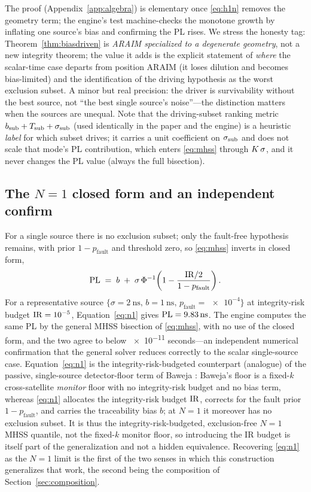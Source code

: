 The proof (Appendix~\ref{app:algebra}) is elementary once \eqref{eq:h1n} removes
the geometry term; the engine's test 
machine-checks the monotone growth by inflating one source's bias and confirming
the PL rises. We stress the honesty tag: Theorem~\ref{thm:biasdriven} is
\emph{ARAIM specialized to a degenerate geometry}, not a new integrity theorem;
the value it adds is the explicit statement of \emph{where} the scalar-time case
departs from position ARAIM (it loses dilution and becomes bias-limited) and the
identification of the driving hypothesis as the worst exclusion subset. A minor
but real precision: the driver is survivability without the best source, not ``the
best single source's noise''---the distinction matters when the sources are
unequal. Note that the driving-subset ranking metric
$b_{\mathrm{sub}}+T_{\mathrm{sub}}+\sigma_{\mathrm{sub}}$ (used identically in the paper and the
engine) is a heuristic \emph{label} for which subset drives; it carries a unit
coefficient on $\sigma_{\mathrm{sub}}$ and does not scale that mode's PL contribution, which
enters \eqref{eq:mhss} through $K\,\sigma$, and it never changes the PL value
(always the full bisection).

\subsection{The \texorpdfstring{$N=1$}{N=1} closed form and an independent confirm}
\label{sec:n1}

For a single source there is no exclusion subset; only the fault-free hypothesis
remains, with prior $1-p_{\mathrm{fault}}$ and threshold zero, so \eqref{eq:mhss}
inverts in closed form,
\begin{equation}
  \mathrm{PL} \;=\; b \;+\; \sigma\,\Phi^{-1}\!\left(1-\frac{\mathrm{IR}/2}{1-p_{\mathrm{fault}}}\right).
  \label{eq:n1}
\end{equation}
For a representative source
$\{\sigma=\SI{2}{\nano\second},\,b=\SI{1}{\nano\second},\,
p_{\mathrm{fault}}=\num{e-4}\}$ at integrity-risk budget $\mathrm{IR}=\num{e-5}$,
Equation~\eqref{eq:n1} gives $\mathrm{PL}=\SI{9.83}{\nano\second}$. The engine computes the
same PL by the general MHSS bisection of \eqref{eq:mhss}, with no use of the
closed form, and the two agree to below \num{e-11} seconds---an independent
numerical confirmation that the general solver reduces correctly to the scalar
single-source case. Equation~\eqref{eq:n1} is the integrity-risk-budgeted counterpart (analogue) of
the passive, single-source detector-floor term of Baweja \citep{baweja2026tpl}:
Baweja's floor is a fixed-$k$ cross-satellite \emph{monitor} floor with no
integrity-risk budget and no bias term, whereas \eqref{eq:n1} allocates the
integrity-risk budget $\mathrm{IR}$, corrects for the fault prior $1-p_{\mathrm{fault}}$,
and carries the traceability bias $b$; at $N=1$ it moreover has no exclusion
subset. It is thus the integrity-risk-budgeted, exclusion-free $N=1$ MHSS quantile,
not the fixed-$k$ monitor floor, so introducing the IR budget is itself part of the
generalization and not a hidden equivalence. Recovering \eqref{eq:n1} as the $N=1$
limit is the first of the two senses in which this construction generalizes that
work, the second being the composition of Section~\ref{sec:composition}.
